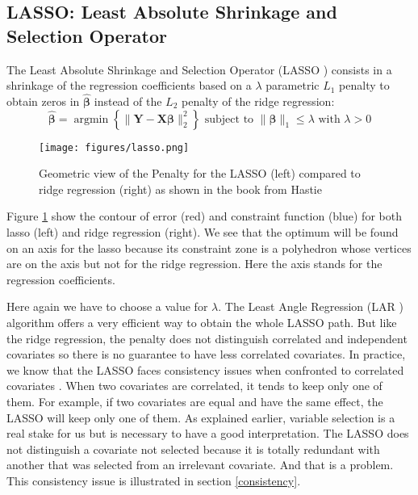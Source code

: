 \documentclass[12pt,a4paper]{report}
\begin{document}
		 \FloatBarrier
		
		\subsection{LASSO: Least Absolute Shrinkage and Selection Operator }		%

The Least Absolute Shrinkage and Selection Operator (\textsc{LASSO} \cite{tibshirani1996regression,tibshiranilasso}) consists in a shrinkage of the regression coefficients based on a $\lambda$ parametric $L_1$ penalty to obtain zeros in $\hat{\boldsymbol{\beta}}$ instead of the $L_2$ penalty of the ridge regression:
		\begin{equation}
		 \boldsymbol{\hat{\beta}}=\operatorname{argmin} \left\lbrace \parallel \boldsymbol{Y}-\boldsymbol{X\beta}\parallel_2^2 \right\rbrace \textrm{ subject to } \parallel\boldsymbol{\beta} \parallel_1\leq \lambda \textrm{ with } \lambda>0
		\end{equation}	
		
		\begin{figure}[h!]
			\centering
			\texttt{[image: figures/lasso.png]} 
			\caption{Geometric view of the Penalty for the LASSO (left) compared to ridge regression (right) as shown in the book from Hastie \cite{hastie2009elements}} \label{lassogeom}
		\end{figure}
		Figure \ref{lassogeom} show the contour of error (red) and constraint function (blue) for both lasso (left) and ridge regression (right). We see that the optimum will be found on an axis for the lasso because its constraint zone is a polyhedron whose vertices are on the axis but not for the ridge regression. Here the axis stands for the regression coefficients.
		
		Here again we have to choose a value for $\lambda$.
	 The Least Angle Regression (\textsc{LAR} \cite{efron2004least}) algorithm offers a very efficient way to obtain the whole LASSO path.  But like the ridge regression, the penalty does not distinguish correlated and independent covariates so there is no guarantee to have less correlated covariates. In practice, we know that the LASSO faces consistency issues when confronted to correlated covariates \cite{Zhao2006MSC}. When two covariates are correlated, it tends to keep only one of them. For example, if two covariates are equal and have the same effect, the LASSO will keep only one of them. As explained earlier, variable selection is a real stake for us but is necessary to have a good interpretation. The LASSO does not distinguish a covariate not selected because it is totally redundant with another that was selected from an irrelevant covariate. And that is a problem. This consistency issue is illustrated in section \ref{consistency}.
\end{document}
